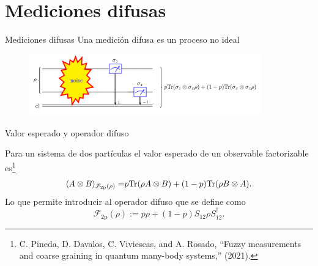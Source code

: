 \documentclass[svgnames,12pt,aspectratio=149]{beamer}
\newcommand{\ra}{\rangle}
\newcommand{\la}{\langle}
\newcommand{\tr}{{\rm Tr}}
\newcommand{\tensor}{\otimes}
\begin{document}
\section{Mediciones difusas}

\begin{frame}{Mediciones difusas}
Una medición difusa es un proceso no ideal 

\begin{figure}[H]
  \centering
  \hspace*{-1cm}
 \includegraphics[width=100mm]{images/fm1.png}
  \caption*{}
\end{figure}

\vspace*{-0.7cm}
\begin{figure}[H]
  \centering
  \caption*{}
  \end{figure} 
\end{frame}



\begin{frame}{Valor esperado y operador difuso}

 
Para un sistema de dos partículas el valor esperado de un observable factorizable es\footnote{C. Pineda, D. Davalos, C. Viviescas, and A. Rosado, ``Fuzzy measurements and coarse graining in quantum many-body systems,'' (2021).} 
\begin{equation*}\label{eq:Expected-Value-FM-2p}
    \begin{split}
      \la {A\otimes B}\ra_{\mathcal{F}_{2\text{p}}(\rho)} =&p\tr(\rho A\tensor B)+(1-p)\tr(\rho B\otimes A).\\
    \end{split}
\end{equation*}Lo que permite introducir al operador difuso que se define como \begin{equation*}\label{eq:op_F2p}
    \mathcal{F}_{2\text{p}}(\rho):=p\rho + (1-p)S_{12}\rho S_{12}^{\dagger}.
\end{equation*}


\end{frame}
\end{document}
